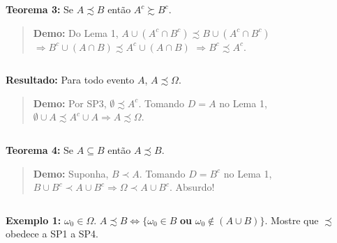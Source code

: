 \documentclass[
]{book}
\begin{document}
\(~\)

\textbf{Teorema 3:}
Se \(A \precsim B\) então \(A^c \succsim B^c\).

\begin{quote}
\textbf{Demo:} Do Lema 1, \(A \cup (A^c \cap B^c) \precsim B \cup (A^c \cap B^c)\) \(\Rightarrow B^c \cup (A \cap B) \precsim A^c \cup (A \cap B)\) \(\Rightarrow B^c \precsim A^c\).
\end{quote}

\(~\)

\textbf{Resultado:} Para todo evento \(A\), \(A \precsim \Omega\).

\begin{quote}
\textbf{Demo:} Por SP3, \(\emptyset \precsim A^c\). Tomando \(D=A\) no Lema 1, \(\emptyset \cup A \precsim A^c \cup A \Rightarrow A \precsim \Omega\).
\end{quote}

\(~\)

\textbf{Teorema 4:}
Se \(A \subseteq B\) então \(A \precsim B\).

\begin{quote}
\textbf{Demo:} Suponha, \(B \prec A\). Tomando \(D=B^c\) no Lema 1, \(B \cup B^c \prec A \cup B^c \Rightarrow \Omega \prec A \cup B^c\). Absurdo!
\end{quote}

\(~\)

\textbf{Exemplo 1:} \(\omega_0 \in \Omega\). \(A \precsim B \Leftrightarrow \{\omega_0 \in B\) \textbf{ou} \(\omega_0 \notin (A \cup B)\}\). Mostre que \(\precsim\) obedece a SP1 a SP4.
\end{document}
